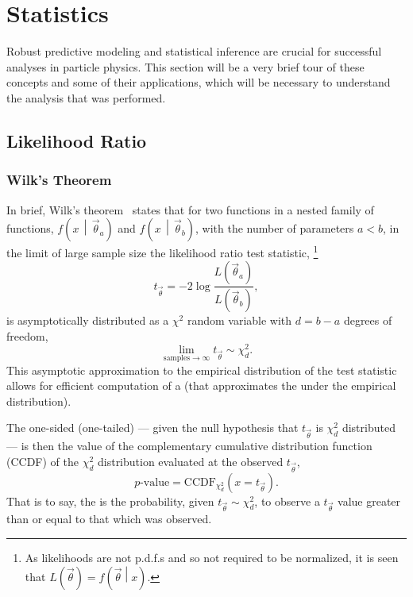 \section{Statistics}\label{section:statistics}

Robust predictive modeling and statistical inference are crucial for successful analyses in particle physics.
This section will be a very brief tour of these concepts and some of their applications, which will be necessary to understand the analysis that was performed.

\subsection{Likelihood Ratio}\label{subsection:likelihood_ratio}

\subsubsection{Wilk's Theorem}\label{subsection:wilks_theorem}

In brief, Wilk's theorem~\cite{Wilks:1938dza} states that for two functions in a nested family of functions, $f\left(x\,\middle|\,\vec{\theta}_{a}\right)$ and $f\left(x\,\middle|\,\vec{\theta}_{b}\right)$, with the number of parameters $a < b$, in the limit of large sample size the likelihood ratio test statistic,%
\footnote{As likelihoods are not p.d.f.s and so not required to be normalized, it is seen that $L\left(\vec{\theta}\right) = f\left(\vec{\theta}\middle|x\right)$.}
\begin{equation}
 t_{\vec{\theta}} = -2 \log \frac{\displaystyle L\left(\vec{\theta}_{a}\right)}{\displaystyle L\left(\vec{\theta}_{b}\right)},
\end{equation}
is asymptotically distributed as a $\chi^2$ random variable with $d=b-a$ degrees of freedom,
\begin{equation}
 \lim_{\mathrm{samples}\to \infty} t_{\vec{\theta}} \sim \chi^2_{d}.\label{eq:wilks_theorem}
\end{equation}
This asymptotic approximation to the empirical distribution of the test statistic allows for efficient computation of a \pvalue{} (that approximates the \pvalue{} under the empirical distribution).

The one-sided (one-tailed) \pvalue{} --- given the null hypothesis that $t_{\vec{\theta}}$ is $\chi_{d}^{2}$ distributed --- is then the value of the complementary cumulative distribution function (CCDF) of the $\chi^2_{d}$ distribution evaluated at the observed $t_{\vec{\theta}}$,
\begin{equation}
 p\textrm{-value} = \textrm{CCDF}_{\chi^2_{d}}\left(x=t_{\vec{\theta}}\right).
\end{equation}
That is to say, the \pvalue{} is the probability, given $t_{\vec{\theta}} \sim \chi^2_{d}$, to observe a $t_{\vec{\theta}}$ value greater than or equal to that which was observed.

